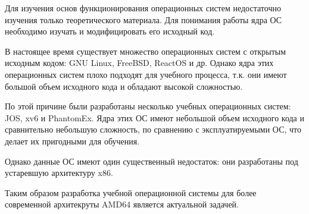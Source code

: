 \Introduction

Для изучения основ функционирования операционных систем недостаточно
изучения только теоретического материала. Для понимания работы ядра
ОС необходимо изучать и модифицировать его исходный код.

В настоящее время существует множество операционных систем с открытым
исходным кодом: GNU Linux, FreeBSD, ReactOS и др. Однако ядра этих
операционных систем плохо подходят для учебного процесса, т.к. они
имеют большой объем исходного кода и обладают высокой сложностью.

По этой причине были разработаны несколько учебных операционных
систем: JOS, xv6 и PhantomEx. Ядра этих ОС имеют небольшой объем
исходного кода и сравнительно небольшую сложность, по сравнению с
эксплуатируемыми ОС, что делает их пригодными для обучения.

Однако данные ОС имеют один существенный недостаток: они разработаны
под устаревшую архитектуру x86.

Таким образом разработка учебной операционной системы для более современной
архитекруты AMD64 является актуальной задачей.
